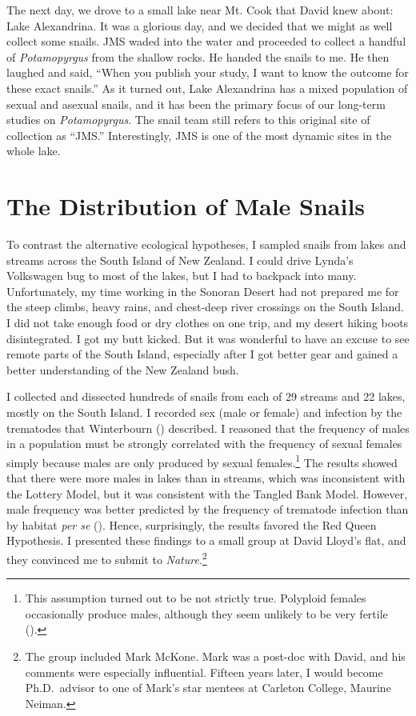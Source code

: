 \documentclass[
  letterpaper,
]{book}
\begin{document}
The next day, we drove to a small lake near Mt. Cook that David knew
about: Lake Alexandrina. It was a glorious day, and we decided that we
might as well collect some snails. JMS waded into the water and
proceeded to collect a handful of \emph{Potamopyrgus} from the shallow
rocks. He handed the snails to me. He then laughed and said, ``When you
publish your study, I want to know the outcome for these exact snails.''
As it turned out, Lake Alexandrina has a mixed population of sexual and
asexual snails, and it has been the primary focus of our long-term
studies on \emph{Potamopyrgus}. The snail team still refers to this
original site of collection as ``JMS.'' Interestingly, JMS is one of the
most dynamic sites in the whole lake.

\section{The Distribution of Male
Snails}\label{the-distribution-of-male-snails}

To contrast the alternative ecological hypotheses, I sampled snails from
lakes and streams across the South Island of New Zealand. I could drive
Lynda's Volkswagen bug to most of the lakes, but I had to backpack into
many. Unfortunately, my time working in the Sonoran Desert had not
prepared me for the steep climbs, heavy rains, and chest-deep river
crossings on the South Island. I did not take enough food or dry clothes
on one trip, and my desert hiking boots disintegrated. I got my butt
kicked. But it was wonderful to have an excuse to see remote parts of
the South Island, especially after I got better gear and gained a better
understanding of the New Zealand bush.

I collected and dissected hundreds of snails from each of 29 streams and
22 lakes, mostly on the South Island. I recorded sex (male or female)
and infection by the trematodes that Winterbourn
() described. I reasoned that the
frequency of males in a population must be strongly correlated with the
frequency of sexual females simply because males are only produced by
sexual females.\footnote{This assumption turned out to be not strictly
  true. Polyploid females occasionally produce males, although they seem
  unlikely to be very fertile ().} The results showed that there were more males in lakes
than in streams, which was inconsistent with the Lottery Model, but it
was consistent with the Tangled Bank Model. However, male frequency was
better predicted by the frequency of trematode infection than by habitat
\emph{per se} (). Hence,
surprisingly, the results favored the Red Queen Hypothesis. I presented
these findings to a small group at David Lloyd's flat, and they
convinced me to submit to \emph{Nature}.\footnote{The group included
  Mark McKone. Mark was a post-doc with David, and his comments were
  especially influential. Fifteen years later, I would become
  Ph.D.~advisor to one of Mark's star mentees at Carleton College,
  Maurine Neiman.}
\end{document}
